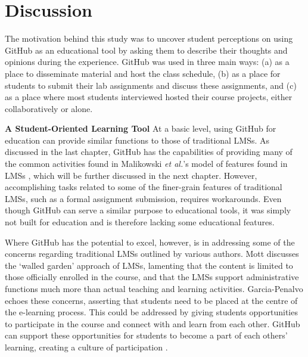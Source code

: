 



\section{Discussion}
The motivation behind this study was to uncover student perceptions on using GitHub as an educational tool by asking them to describe their thoughts and opinions during the experience. GitHub was used in three main ways: (a) as a place to disseminate material and host the class schedule, (b) as a place for students to submit their lab assignments and discuss these assignments, and (c) as a place where most students interviewed hosted their course projects, either collaboratively or alone.

\textbf{A Student-Oriented Learning Tool}
At a basic level, using GitHub for education can provide similar functions to those of traditional LMSs. As discussed in the last chapter, GitHub has the capabilities of providing many of the common activities found in Malikowski \textit{et al.}'s model of features found in LMSs \cite{malikowski2007model}, which will be further discussed in the next chapter. However, accomplishing tasks related to some of the finer-grain features of traditional LMSs, such as a formal assignment submission, requires workarounds. Even though GitHub can serve a similar purpose to educational tools, it was simply not built for education and is therefore lacking some educational features.

Where GitHub has the potential to excel, however, is in addressing some of the concerns regarding traditional LMSs outlined by various authors. Mott \cite{mott2010envisioning} discusses the `walled garden' approach of LMSs, lamenting that the content is limited to those officially enrolled in the course, and that the LMSs support administrative functions much more than actual teaching and learning activities. Garcia-Penalvo \cite{garcia2011opening} echoes these concerns, asserting that students need to be placed at the centre of the e-learning process. This could be addressed by giving students opportunities to participate in the course and connect with and learn from each other. GitHub can support these opportunities for students to become a part of each others' learning, creating a culture of participation \cite{jenkins2009confronting}. \\

